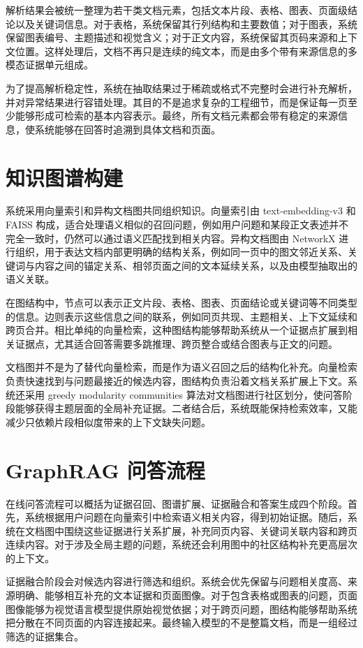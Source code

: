 解析结果会被统一整理为若干类文档元素，包括文本片段、表格、图表、页面级结论以及关键词信息。对于表格，系统保留其行列结构和主要数值；对于图表，系统保留图表编号、主题描述和视觉含义；对于正文内容，系统保留其页码来源和上下文位置。这样处理后，文档不再只是连续的纯文本，而是由多个带有来源信息的多模态证据单元组成。

为了提高解析稳定性，系统在抽取结果过于稀疏或格式不完整时会进行补充解析，并对异常结果进行容错处理。其目的不是追求复杂的工程细节，而是保证每一页至少能够形成可检索的基本内容表示。最终，所有文档元素都会带有稳定的来源信息，使系统能够在回答时追溯到具体文档和页面。

\section{知识图谱构建}\label{sec:sys-graph}

系统采用向量索引和异构文档图共同组织知识。向量索引由 text-embedding-v3 和 FAISS 构成，适合处理语义相似的召回问题，例如用户问题和某段正文表述并不完全一致时，仍然可以通过语义匹配找到相关内容。异构文档图由 NetworkX 进行组织，用于表达文档内部更明确的结构关系，例如同一页中的图文邻近关系、关键词与内容之间的锚定关系、相邻页面之间的文本延续关系，以及由模型抽取出的语义关联。

在图结构中，节点可以表示正文片段、表格、图表、页面结论或关键词等不同类型的信息。边则表示这些信息之间的联系，例如同页共现、主题相关、上下文延续和跨页合并。相比单纯的向量检索，这种图结构能够帮助系统从一个证据点扩展到相关证据点，尤其适合回答需要多跳推理、跨页整合或结合图表与正文的问题。

文档图并不是为了替代向量检索，而是作为语义召回之后的结构化补充。向量检索负责快速找到与问题最接近的候选内容，图结构负责沿着文档关系扩展上下文。系统还采用 greedy modularity communities 算法对文档图进行社区划分，使问答阶段能够获得主题层面的全局补充证据。二者结合后，系统既能保持检索效率，又能减少只依赖片段相似度带来的上下文缺失问题。

\section{GraphRAG 问答流程}\label{sec:sys-rag}

在线问答流程可以概括为证据召回、图谱扩展、证据融合和答案生成四个阶段。首先，系统根据用户问题在向量索引中检索语义相关内容，得到初始证据。随后，系统在文档图中围绕这些证据进行关系扩展，补充同页内容、关键词关联内容和跨页连续内容。对于涉及全局主题的问题，系统还会利用图中的社区结构补充更高层次的上下文。

证据融合阶段会对候选内容进行筛选和组织。系统会优先保留与问题相关度高、来源明确、能够相互补充的文本证据和页面图像。对于包含表格或图表的问题，页面图像能够为视觉语言模型提供原始视觉依据；对于跨页问题，图结构能够帮助系统把分散在不同页面的内容连接起来。最终输入模型的不是整篇文档，而是一组经过筛选的证据集合。


